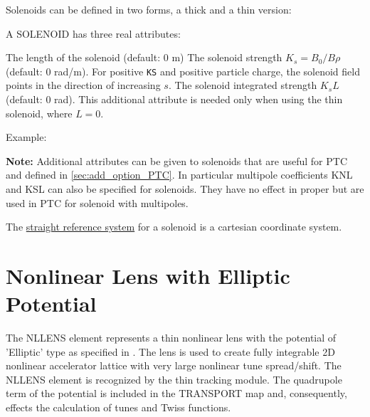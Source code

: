 Solenoids can be defined in two forms, a thick and a thin version: 


A SOLENOID has three real attributes: 
\begin{madlist}
    The length of the solenoid (default: 0 m) 
    The solenoid strength $K_s = B_0 / B\rho$ (default: 0
     rad/m). For positive {\tt KS} and positive particle charge, the solenoid
     field points in the direction of increasing $s$.  
    The solenoid integrated strength $K_s L$
     (default: 0 rad).  This additional attribute is needed only when
     using the thin solenoid,  where $L=0$.     
\end{madlist}

Example: 

{\bf Note:} Additional attributes can be given to solenoids that
are useful for PTC and defined in \ref{sec:add_option_PTC}.
In particular multipole coefficients KNL and KSL can also be specified for 
solenoids. They have no effect in \madx proper but are used in PTC for 
solenoid with multipoles.

The \href{local_system.html#straight}{straight reference system} for a
solenoid is a cartesian coordinate system. 
 


\section{Nonlinear Lens with Elliptic Potential}
\label{sec:nllens}


The NLLENS element represents a thin nonlinear lens with the potential
of 'Elliptic' type as specified in \cite{danilov2010}. The lens is used
to create fully integrable 2D nonlinear accelerator lattice with very
large nonlinear tune spread/shift. The NLLENS element is recognized by
the thin tracking module. The quadrupole term of the potential is
included in the TRANSPORT map and, consequently, effects the calculation
of tunes and Twiss functions.   

